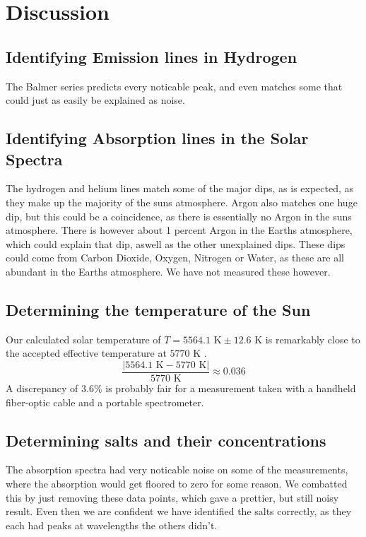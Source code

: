 \chapter{Discussion}
\vspace{-0.25em}
\section{Identifying Emission lines in Hydrogen}
The Balmer series predicts every noticable peak, and even matches some that could just as easily be explained as noise.
\vspace{-1em}
\section{Identifying Absorption lines in the Solar Spectra}
The hydrogen and helium lines match some of the major dips, as is expected, as they make up the majority of the suns atmosphere.
Argon also matches one huge dip, but this could be a coincidence, as there is essentially no Argon in the suns atmosphere.
There is however about 1 percent Argon in the Earths atmosphere, which could explain that dip, aswell as the other unexplained dips.
These dips could come from Carbon Dioxide, Oxygen, Nitrogen or Water, as these are all abundant in the Earths atmosphere.
We have not measured these however.
\vspace{-1em}
\section{Determining the temperature of the Sun}
Our calculated solar temperature of $T = 5564.1 \text{ K} \pm 12.6 \text{ K}$ is remarkably close to the accepted effective temperature at $5770 \text{ K}$ \autocite[p. 574]{LissauerDePater2013}. 
$$\frac{|5564.1 \text{ K} - 5770 \text{ K}|}{5770 \text{ K}} \approx 0.036$$
A discrepancy of $3.6\%$ is probably fair for a measurement taken with a handheld fiber-optic cable and a portable spectrometer.
\vspace{-1em}
\section{Determining salts and their concentrations}
The absorption spectra had very noticable noise on some of the measurements, where the absorption would get floored to zero for some reason.
We combatted this by just removing these data points, which gave a prettier, but still noisy result.
Even then we are confident we have identified the salts correctly, as they each had peaks at wavelengths the others didn't.
\vspace{-1em}

